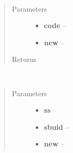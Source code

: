 \documentclass[a4paper,10pt,english]{sphinxmanual}
\begin{document}
\begin{fulllineitems}
\begin{fulllineitems}
\end{fulllineitems}


\begin{fulllineitems}
\label{wtoapi:wtoDatabase.WtoDatabase.row_sciencegoals}~\begin{quote}\begin{description}
\item[{Parameters}] \leavevmode\begin{itemize}
\item {} 
\textbf{code} -- 

\item {} 
\textbf{new} -- 

\end{itemize}

\item[{Returns}] \leavevmode


\end{description}\end{quote}

\end{fulllineitems}


\begin{fulllineitems}
\label{wtoapi:wtoDatabase.WtoDatabase.row_spectralconf}~\begin{quote}\begin{description}
\item[{Parameters}] \leavevmode\begin{itemize}
\item {} 
\textbf{ss} -- 

\item {} 
\textbf{sbuid} -- 

\item {} 
\textbf{new} -- 

\end{itemize}

\end{description}\end{quote}

\end{fulllineitems}



\end{fulllineitems}
\end{document}
